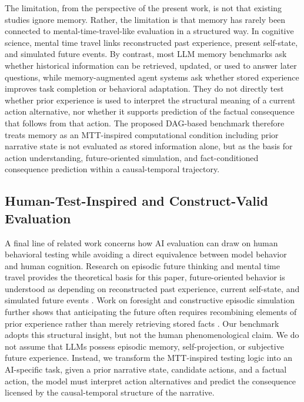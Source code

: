 \documentclass[pdflatex,sn-mathphys-num]{sn-jnl}%
\theoremstyle{thmstyleone}%
\theoremstyle{thmstyletwo}%
\theoremstyle{thmstylethree}%
\begin{document}
The limitation, from the perspective of the present work, is not that existing studies ignore memory. Rather, the limitation is that memory has rarely been connected to mental-time-travel-like evaluation in a structured way. In cognitive science, mental time travel links reconstructed past experience, present self-state, and simulated future events. By contrast, most LLM memory benchmarks ask whether historical information can be retrieved, updated, or used to answer later questions, while memory-augmented agent systems ask whether stored experience improves task completion or behavioral adaptation. They do not directly test whether prior experience is used to interpret the structural meaning of a current action alternative, nor whether it supports prediction of the factual consequence that follows from that action. The proposed DAG-based benchmark therefore treats memory as an MTT-inspired computational condition including prior narrative state is not evaluated as stored information alone, but as the basis for action understanding, future-oriented simulation, and fact-conditioned consequence prediction within a causal-temporal trajectory.

\subsection{Human-Test-Inspired and Construct-Valid Evaluation}
A final line of related work concerns how AI evaluation can draw on human behavioral testing while avoiding a direct equivalence between model behavior and human cognition. Research on episodic future thinking and mental time travel provides the theoretical basis for this paper, future-oriented behavior is understood as depending on reconstructed past experience, current self-state, and simulated future events \cite{atance2001episodic}. Work on foresight and constructive episodic simulation further shows that anticipating the future often requires recombining elements of prior experience rather than merely retrieving stored facts \cite{suddendorf2007evolution}. Our benchmark adopts this structural insight, but not the human phenomenological claim. We do not assume that LLMs possess episodic memory, self-projection, or subjective future experience. Instead, we transform the MTT-inspired testing logic into an AI-specific task, given a prior narrative state, candidate actions, and a factual action, the model must interpret action alternatives and predict the consequence licensed by the causal-temporal structure of the narrative.
\end{document}
